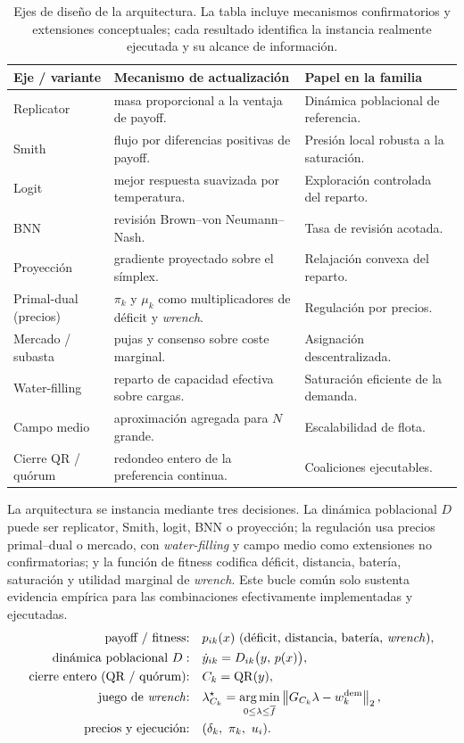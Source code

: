 \begin{table}[H]
\centering
\small
\renewcommand{\arraystretch}{1.25}
\begin{tabularx}{\textwidth}{p{2.9cm} Y Y}
\toprule
Eje / variante & Mecanismo de actualización & Papel en la familia \\
\midrule
Replicator & masa proporcional a la ventaja de payoff. & Dinámica poblacional de referencia. \\
Smith & flujo por diferencias positivas de payoff. & Presión local robusta a la saturación. \\
Logit & mejor respuesta suavizada por temperatura. & Exploración controlada del reparto. \\
BNN & revisión Brown--von Neumann--Nash. & Tasa de revisión acotada. \\
Proyección & gradiente proyectado sobre el símplex. & Relajación convexa del reparto. \\
Primal-dual (precios) & $\pi_k$ y $\mu_k$ como multiplicadores de déficit y \emph{wrench}. & Regulación por precios. \\
Mercado / subasta & pujas y consenso sobre coste marginal. & Asignación descentralizada. \\
Water-filling & reparto de capacidad efectiva sobre cargas. & Saturación eficiente de la demanda. \\
Campo medio & aproximación agregada para $N$ grande. & Escalabilidad de flota. \\
Cierre QR / quórum & redondeo entero de la preferencia continua. & Coaliciones ejecutables. \\
\bottomrule
\end{tabularx}
\caption{Ejes de dise\~no de la arquitectura. La tabla incluye mecanismos confirmatorios y extensiones conceptuales; cada resultado identifica la instancia realmente ejecutada y su alcance de informaci\'on.}
\label{tab:familia-controladores}
\end{table}

La arquitectura se instancia mediante tres decisiones. La din\'amica poblacional $D$ puede ser replicator, Smith, logit, BNN o proyecci\'on; la regulaci\'on usa precios primal--dual o mercado, con \emph{water-filling} y campo medio como extensiones no confirmatorias; y la funci\'on de fitness codifica d\'eficit, distancia, bater\'ia, saturaci\'on y utilidad marginal de \emph{wrench}. Este bucle com\'un solo sustenta evidencia emp\'irica para las combinaciones efectivamente implementadas y ejecutadas.
\[
  \begin{aligned}
    \text{payoff / fitness:}\quad
      & p_{ik}(x)\ \text{(déficit, distancia, batería, \emph{wrench})}, \\
    \text{dinámica poblacional } D:\quad
      & \dot y_{ik} = D_{ik}\bigl(y,\,p(x)\bigr), \\
    \text{cierre entero (QR / quórum):}\quad
      & C_k = \mathrm{QR}(y), \\
    \text{juego de \emph{wrench}:}\quad
      & \lambda_{C_k}^\star = \operatorname*{arg\,min}_{0\le\lambda\le\overline{f}}
        \left\lVert G_{C_k}\lambda - w_k^{\rm dem}\right\rVert_2, \\
    \text{precios y ejecución:}\quad
      & (\delta_k,\ \pi_k,\ u_i).
  \end{aligned}
\]

